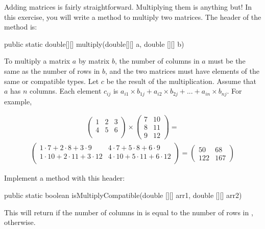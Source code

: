\begin{exercise}
Adding matrices is fairly straightforward. Multiplying them is anything but! In this exercise, you will write a method to multiply two matrices. The header of the method is:

\begin{code}
public static double[][] multiply(double[][] a, double [][] b)
\end{code}

To multiply a matrix $a$ by matrix $b$, the number of columns in $a$ must be the same as the number of rows in $b$, and the two matrices must have elements of the same or compatible types. Let $c$ be the result of the multiplication. Assume that $a$ has $n$ columns. Each element $c_{ij}$ is $a_{i1} \times b_{1j} + a_{i2} \times b_{2j} + ... + a_{in} \times b_{nj}$. For example,

\begin{align*}
\begin{pmatrix}
1 & 2 & 3 \\
4 & 5 & 6 \\
\end{pmatrix}
\times
\begin{pmatrix}
7 & 10 \\
8 & 11 \\
9 & 12
\end{pmatrix}
=
\end{align*}
%
%
\begin{align*}
\begin{pmatrix}
1\cdot 7+2\cdot 8+3\cdot 9 & 4\cdot 7+5\cdot 8+6\cdot 9\\
1\cdot 10+2\cdot 11+3\cdot 12 &  4\cdot 10+5\cdot 11+6\cdot 12\\
\end{pmatrix}
=
\begin{pmatrix}
50 & 68\\
122 & 167
\end{pmatrix}
\end{align*}

Implement a method with this header:

\begin{code}
public static boolean isMultiplyCompatible(double [][] arr1,
    double [][] arr2)
\end{code}

This will return  if the number of columns in  is equal to the number of rows in ,  otherwise.


\end{exercise}
